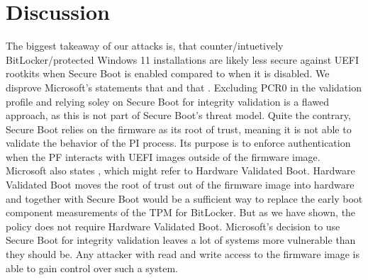 


\chapter{Discussion}
\label{sec:discussion}

The biggest takeaway of our attacks is, that counter\-/intuetively BitLocker\-/protected Windows 11 installations are likely less secure against \ac{UEFI} rootkits when Secure Boot is enabled compared to when it is disabled.
We disprove Microsoft's statements that  and that .
Excluding \ac{PCR}0 in the validation profile and relying soley on Secure Boot for integrity validation is a flawed approach, as this is not part of Secure Boot's threat model.
Quite the contrary, Secure Boot relies on the firmware as its root of trust, meaning it is not able to validate the behavior of the \ac{PI} process.
Its purpose is to enforce authentication when the \ac{PF} interacts with \ac{UEFI} images outside of the firmware image.
Microsoft also states , which might refer to Hardware Validated Boot.
Hardware Validated Boot moves the root of trust out of the firmware image into hardware and together with Secure Boot would be a sufficient way to replace the early boot component measurements of the \ac{TPM} for BitLocker.
But as we have shown, the policy does not require Hardware Validated Boot.
Microsoft's decision to use Secure Boot for integrity validation leaves a lot of systems more vulnerable than they should be.
Any attacker with read and write access to the firmware image is able to gain control over such a system.
